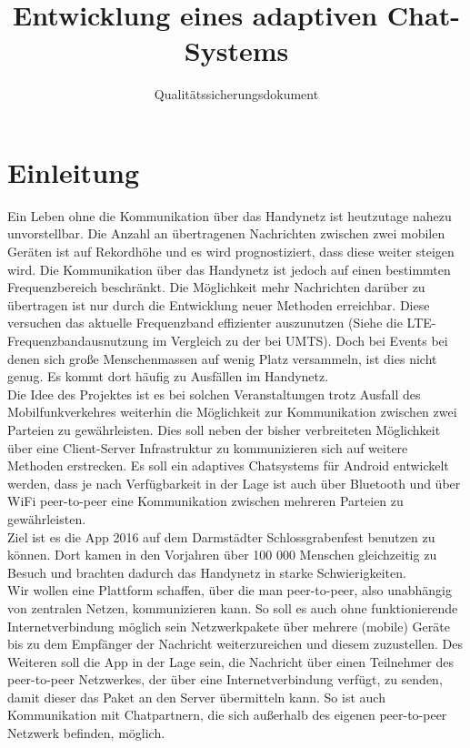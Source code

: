 \documentclass[accentcolor=tud0b,12pt,paper=a4]{tudreport}
\title{Entwicklung eines adaptiven Chat-Systems}
\subtitle{Qualitätssicherungsdokument}
\begin{document}
	\maketitle
	\tableofcontents 
	
	\chapter{Einleitung}
		Ein Leben ohne die Kommunikation über das Handynetz ist heutzutage nahezu unvorstellbar. Die Anzahl an übertragenen Nachrichten zwischen zwei mobilen Geräten ist auf Rekordhöhe und es wird prognostiziert, dass diese weiter steigen wird. Die Kommunikation über das Handynetz ist jedoch auf einen bestimmten Frequenzbereich beschränkt. Die Möglichkeit mehr Nachrichten darüber zu übertragen ist nur durch die Entwicklung neuer Methoden erreichbar. Diese versuchen das aktuelle Frequenzband effizienter auszunutzen (Siehe die LTE-Frequenzbandausnutzung im Vergleich zu der bei UMTS). Doch bei Events bei denen sich große Menschenmassen auf wenig Platz versammeln, ist dies nicht genug. Es kommt dort häufig zu Ausfällen im Handynetz. \\

		Die Idee des Projektes ist es bei solchen Veranstaltungen trotz Ausfall des Mobilfunkverkehres weiterhin die Möglichkeit zur Kommunikation zwischen zwei Parteien zu gewährleisten. Dies soll neben der bisher verbreiteten Möglichkeit über eine Client-Server Infrastruktur zu kommunizieren sich auf weitere Methoden erstrecken. Es soll ein adaptives Chatsystems für Android entwickelt werden, dass je nach Verfügbarkeit in der Lage ist auch über Bluetooth und über WiFi peer-to-peer eine Kommunikation zwischen mehreren Parteien zu gewährleisten. \\

		Ziel ist es die App 2016 auf dem Darmstädter Schlossgrabenfest benutzen zu können. Dort kamen in den Vorjahren über 100 000 Menschen gleichzeitig zu Besuch und brachten dadurch das Handynetz in starke Schwierigkeiten.\\

		Wir wollen eine Plattform schaffen, über die man peer-to-peer, also unabhängig von zentralen Netzen, kommunizieren kann. So soll es auch ohne funktionierende Internetverbindung möglich sein Netzwerkpakete über mehrere (mobile) Geräte bis zu dem Empfänger der Nachricht weiterzureichen und diesem zuzustellen. Des Weiteren soll die App in der Lage sein, die Nachricht über einen Teilnehmer des peer-to-peer Netzwerkes, der über eine Internetverbindung verfügt, zu senden, damit dieser das Paket an den Server übermitteln kann. So ist auch Kommunikation mit Chatpartnern, die sich außerhalb des eigenen peer-to-peer Netzwerk befinden, möglich.\\
\end{document}
